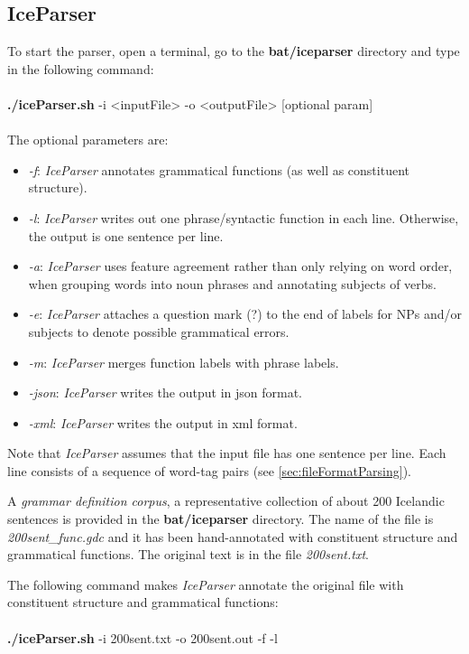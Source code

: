\documentclass[11pt]{article}
\begin{document}
\subsection{IceParser}
To start the parser, open a terminal, go to the \textbf{bat/iceparser} directory and type in the following command:\\ \\
{\bf ./iceParser.sh} -i <inputFile> -o <outputFile> [optional param] \\ \\
The optional parameters are:
\begin{itemize}
\item \emph{-f}: \emph{IceParser} annotates grammatical functions (as well as constituent structure).
\item \emph{-l}: \emph{IceParser} writes out one phrase/syntactic function in each line. Otherwise, the output is one sentence per line.
\item \emph{-a}: \emph{IceParser} uses feature agreement rather than only relying on word order, when grouping words into noun phrases and annotating subjects of verbs.
\item \emph{-e}: \emph{IceParser} attaches a question mark (?) to the end of labels for NPs and/or subjects to denote possible grammatical errors.
\item \emph{-m}: \emph{IceParser} merges function labels with phrase labels.
\item \emph{-json}: \emph{IceParser} writes the output in json format.
\item \emph{-xml}: \emph{IceParser} writes the output in xml format.
\end{itemize}

Note that \emph{IceParser} assumes that the input file has one sentence per line.
Each line consists of a sequence of word-tag pairs (see \ref{sec:fileFormatParsing}).

A \emph{grammar definition corpus}, a representative collection of about 200 Icelandic sentences \citep{lof06c} is provided in the \textbf{bat/iceparser} directory.
The name of the file is \emph{200sent\_func.gdc} and it has been hand-annotated with constituent structure and grammatical functions.
The original text is in the file \emph{200sent.txt}.

The following command makes \emph{IceParser} annotate the original file with constituent structure and grammatical functions: \\ \\
{\bf ./iceParser.sh} -i 200sent.txt -o 200sent.out -f -l \\
\end{document}
